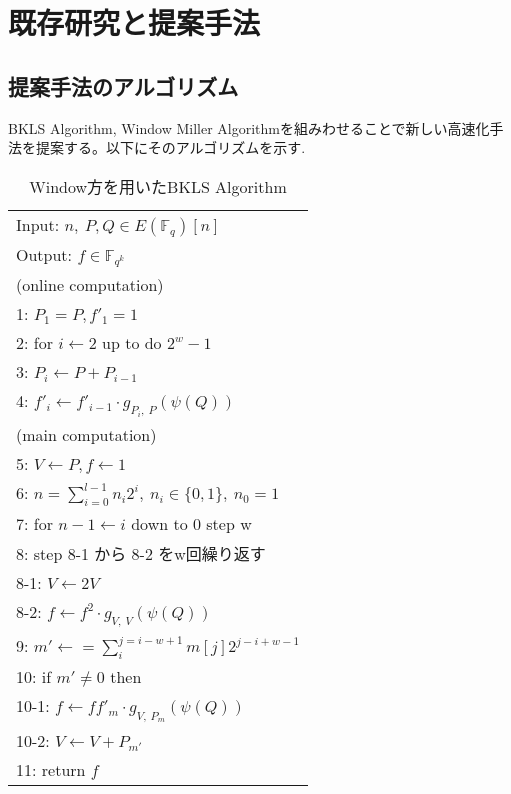\chapter{既存研究と提案手法}
\section{提案手法のアルゴリズム}
BKLS Algorithm, Window Miller Algorithmを組みわせることで新しい高速化手法を提案する。以下にそのアルゴリズムを示す.
\par
\begin{table}[htbp]
 \begin{center}
  \begin{tabular}{|l|}
     \hline
     Input: $n, \ P, Q \in E(\mathbb{F}_q)[n]$ \\
     Output: $f \in \mathbb{F}_{q^k}$  \\
     \hline
     (online computation) \\
     1: \quad $P_1 = P, f'_1=1 $\\
     2: \quad for $i \gets 2$ up to do $2^w -1$\\
     3: \quad \quad $P_i \gets P + P_{i-1} $\\
     4: \quad \quad $f'_i \gets f'_{i-1} \cdot g_{P_i,\ P}(\psi (Q))$\\

     (main computation) \\
     5: \quad $V \gets P, f \gets 1 $\\
     6: \quad $n=\sum^{l - 1}_{i=0} n_i 2^i, \ n_i \in \{0,1\},\ n_0 = 1$\\

     7: \quad for $ n-1 \gets i$ down to 0 step w\\
     8: \quad step 8-1 から 8-2 をw回繰り返す\\
     8-1: \quad \quad $V \gets 2V $\\
     8-2: \quad \quad $f \gets f^2 \cdot g_{V,\ V}(\psi (Q))$\\

     9: \quad $m' \gets =\sum^{j=i-w+1}_{i} m[j]2^{j-i+w-1} $\\
     10: \quad if $m' \neq 0$ then\\
     10-1: \quad \quad $f \gets ff'_m \cdot g_{V,\ P_m}(\psi (Q))$ \\
     10-2: \quad \quad $V \gets V + P_{m'} $\\
     11: \quad return $f$\\
     \hline
  \end{tabular}
 \end{center}
 \caption{Window方を用いたBKLS Algorithm}
\end{table}
\par
\clearpage

